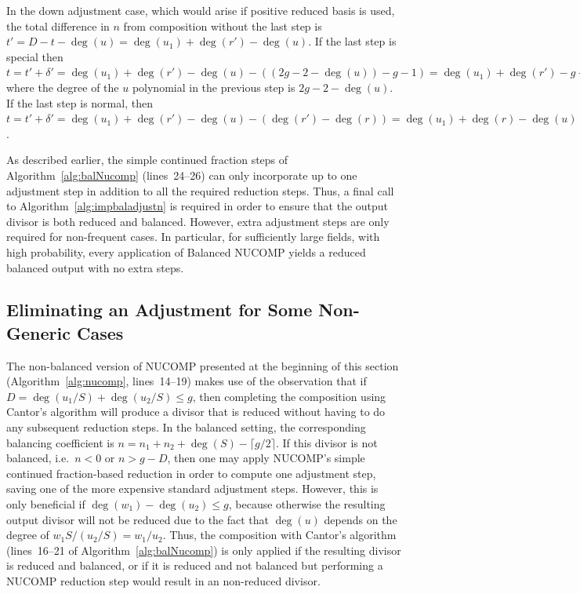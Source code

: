 In the down adjustment case, which would arise if positive reduced basis is
used, the total difference in $n$ from composition without the last step is $t'
= D - t - \deg(u) = \deg(u_1) + \deg(r') - \deg(u)$. If the last step is special
then $ t = t' + \delta' =  \deg(u_1) + \deg(r') - \deg(u) - ((2g - 2 - \deg(u))
- g-1) = \deg(u_1) + \deg(r') - g- 1$ where the degree of the $u$ polynomial in
the previous step is $2g - 2 - \deg(u)$. If the last step is normal, then $t =
t' + \delta' = \deg(u_1) + \deg(r') - \deg(u) - (\deg(r') - \deg(r)) = \deg(u_1)
+ \deg(r) - \deg(u)$. 

As described earlier, the simple continued fraction steps of
Algorithm~\ref{alg:balNucomp} (lines~24--26) can only incorporate up to one
adjustment step in addition to all the required reduction steps. Thus, a final
call to Algorithm~\ref{alg:impbaladjustn} is required in order to ensure that the
output divisor is both reduced and balanced. However, extra adjustment steps are
only required for non-frequent cases. In particular, for sufficiently large
fields, with high probability, every application of Balanced NUCOMP yields a
reduced balanced output with no extra steps.


\subsection{Eliminating an Adjustment for Some Non-Generic Cases}\label{sec:eliminateadj}
The non-balanced version of NUCOMP presented at the beginning of this section
(Algorithm~\ref{alg:nucomp}, lines~14--19) makes use of the observation that if
$D = \deg(u_1/S) + \deg(u_2/S) \leq g$, then completing the composition using
Cantor's algorithm will produce a divisor that is reduced without having to do
any subsequent reduction steps. In the balanced setting, the corresponding
balancing coefficient is $n = n_1 + n_2 + \deg(S) - \lceil g/2 \rceil$.  If this
divisor is not balanced, i.e.\ $n < 0$ or $n > g-D$, then one may apply NUCOMP's
simple continued fraction-based reduction in order to compute one adjustment
step, saving one of the more expensive standard adjustment steps.  However, this
is only beneficial if $\deg(w_1) - \deg(u_2) \leq g$, because otherwise the
resulting output divisor will not be reduced due to the fact that $\deg(u)$
depends on the degree of $w_1S/(u_2/S) = w_1/u_2$. Thus, the composition with
Cantor's algorithm (lines~16--21 of Algorithm~\ref{alg:balNucomp}) is only
applied if the resulting divisor is reduced and balanced, or if it is reduced
and not balanced but performing a NUCOMP reduction step would result in an
non-reduced divisor.


